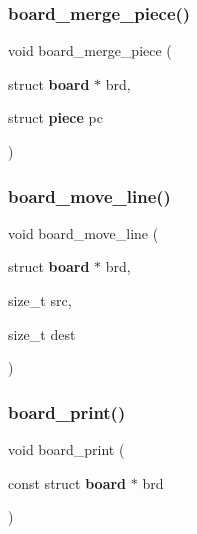 \mbox{\label{board_8c_a7b287e4e327ee01cc4d8fecfc9f580d7}} 
\subsubsection{board\+\_\+merge\+\_\+piece()}
{\footnotesize\ttfamily void board\+\_\+merge\+\_\+piece (\begin{DoxyParamCaption}\item[{struct \textbf{ board} $\ast$}]{brd,  }\item[{struct \textbf{ piece}}]{pc }\end{DoxyParamCaption})\hspace{0.3cm}{\ttfamily [inline]}}

\mbox{\label{board_8c_a0d12914ac12389ecbfe2181d6d37ca56}} 
\subsubsection{board\+\_\+move\+\_\+line()}
{\footnotesize\ttfamily void board\+\_\+move\+\_\+line (\begin{DoxyParamCaption}\item[{struct \textbf{ board} $\ast$}]{brd,  }\item[{size\+\_\+t}]{src,  }\item[{size\+\_\+t}]{dest }\end{DoxyParamCaption})\hspace{0.3cm}{\ttfamily [inline]}}

\mbox{\label{board_8c_a5b330150c360732662e8ade21782ceab}} 
\subsubsection{board\+\_\+print()}
{\footnotesize\ttfamily void board\+\_\+print (\begin{DoxyParamCaption}\item[{const struct \textbf{ board} $\ast$}]{brd }\end{DoxyParamCaption})\hspace{0.3cm}{\ttfamily [inline]}}

